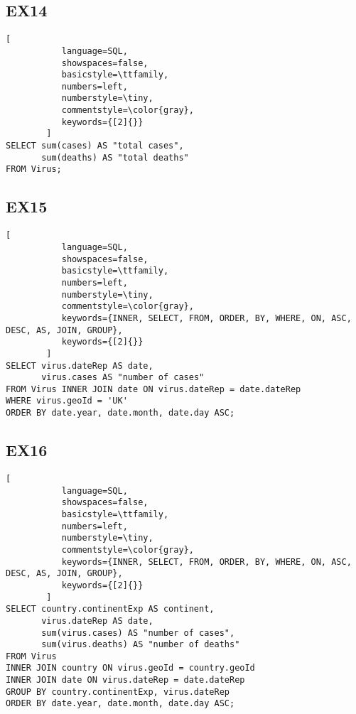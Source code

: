 \documentclass[12pt]{article}
\begin{document}
\subsection*{EX14}

\begin{lstlisting}[
           language=SQL,
           showspaces=false,
           basicstyle=\ttfamily,
           numbers=left,
           numberstyle=\tiny,
           commentstyle=\color{gray},
           keywords={[2]{}}
        ]
SELECT sum(cases) AS "total cases", 
       sum(deaths) AS "total deaths"
FROM Virus;
\end{lstlisting}

\subsection*{EX15}

\begin{lstlisting}[
           language=SQL,
           showspaces=false,
           basicstyle=\ttfamily,
           numbers=left,
           numberstyle=\tiny,
           commentstyle=\color{gray},
           keywords={INNER, SELECT, FROM, ORDER, BY, WHERE, ON, ASC, DESC, AS, JOIN, GROUP},
           keywords={[2]{}}
        ]
SELECT virus.dateRep AS date,
       virus.cases AS "number of cases"
FROM Virus INNER JOIN date ON virus.dateRep = date.dateRep
WHERE virus.geoId = 'UK'
ORDER BY date.year, date.month, date.day ASC;
\end{lstlisting}

\pagebreak

\subsection*{EX16}

\begin{lstlisting}[
           language=SQL,
           showspaces=false,
           basicstyle=\ttfamily,
           numbers=left,
           numberstyle=\tiny,
           commentstyle=\color{gray},
           keywords={INNER, SELECT, FROM, ORDER, BY, WHERE, ON, ASC, DESC, AS, JOIN, GROUP},
           keywords={[2]{}}
        ]
SELECT country.continentExp AS continent,
       virus.dateRep AS date,
       sum(virus.cases) AS "number of cases",
       sum(virus.deaths) AS "number of deaths"
FROM Virus
INNER JOIN country ON virus.geoId = country.geoId
INNER JOIN date ON virus.dateRep = date.dateRep
GROUP BY country.continentExp, virus.dateRep
ORDER BY date.year, date.month, date.day ASC;
\end{lstlisting}
\end{document}
